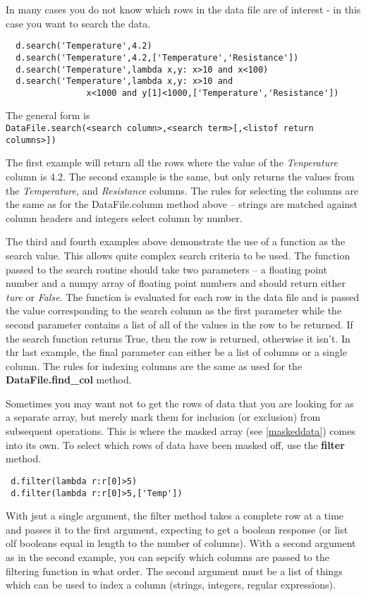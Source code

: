 \documentclass[a4paper,11pt]{scrartcl}
\begin{document}
In many cases you do not know which rows in the data file are of interest - in
this case you want to search the data.
\begin{lstlisting}
  d.search('Temperature',4.2)
  d.search('Temperature',4.2,['Temperature','Resistance'])
  d.search('Temperature',lambda x,y: x>10 and x<100)
  d.search('Temperature',lambda x,y: x>10 and
                x<1000 and y[1]<1000,['Temperature','Resistance'])
\end{lstlisting}
The general form is \\\verb:DataFile.search(<search column>,<search term>[,<listof return columns>]):

The first example will return all the rows where the value of the
\textit{Tenperature} column is 4.2. The second example is the same, but only
returns the values from the \textit{Temperature}, and \textit{Resistance}
columns. The rules for selecting the columns are the same as for the
DataFile.column method above -- strings are matched against column headers and
integers select column by number.

The third and fourth examples above demonstrate the use of a function as the
search value. This allows quite complex search criteria to be used. The function
passed to the search routine should take two parameters -- a floating point
number and a numpy array of floating point numbers and should return either
\textit{ture} or \textit{False}. The function is evaluated for each row in the
data file and is passed the value corresponding to the search column as the
first parameter while the second parameter contains a list of all of the values
in the row to be returned. If the search function returns True, then the row is
returned, otherwise it isn't. In thr last example, the final parameter can
either be a list of columns or a single column. The rules for indexing columns
are the same as used for the \textbf{DataFile.find\_col} method.

Sometimes you may want not to get the rows of data that you are looking for as a
separate array, but merely mark them for inclusion (or exclusion) from subsequent
operations. This is where the masked array (see \ref{maskeddata}) comes into its own.
To select which rows of data have been masked off, use the \textbf{filter} method.

\begin{lstlisting}
 d.filter(lambda r:r[0]>5)
 d.filter(lambda r:r[0]>5,['Temp'])
\end{lstlisting}

With jsut a single argument, the filter method takes a complete row at a time and passes it
to the first argument, expecting to get a boolean response (or list olf booleans equal in length
to the number of columns). With a second argument as in the second example, you can sepcify which
columns are passed to the filtering function in what order. The second argument must be a list
of things which can be used to index a column (\ie strings, integers, regular expressions).
\end{document}
